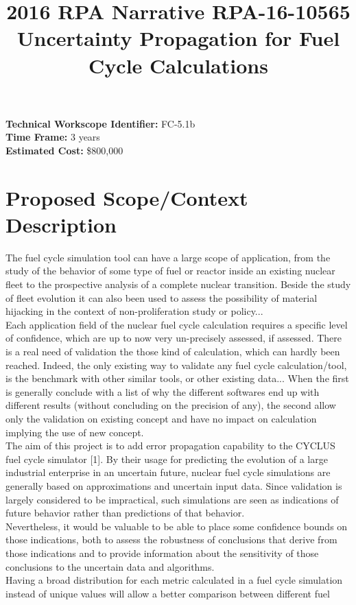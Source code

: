 \documentclass[dvips,12pt]{article}
\title{2016 RPA Narrative RPA-16-10565\\
Uncertainty Propagation for Fuel Cycle Calculations}
\begin{document}
\noindent\textbf{Technical Workscope Identifier:} FC-5.1b\\
\textbf{Time Frame:} 3 years\\
\textbf{Estimated Cost:} \$800,000\\


\section{Proposed Scope/Context Description}
The fuel cycle simulation tool can have a large
scope of application, from the study of the
behavior of some type of fuel or reactor inside an
existing nuclear fleet to the prospective analysis
of a complete nuclear transition. Beside the study
of fleet evolution it can also been used to assess
the possibility of material hijacking in the
context of non-proliferation study or
policy...\\ Each application field of the nuclear
fuel cycle calculation requires a specific level
of confidence, which are up to now very
un-precisely assessed, if assessed. There is a
real need of validation the those kind of
calculation, which can hardly been
reached. Indeed, the only existing way to validate
any fuel cycle calculation/tool, is the benchmark
with other similar tools, or other existing
data... When the first is generally conclude with
a list of why the different softwares end up with
different results (without concluding on the
precision of any), the second allow only the
validation on existing concept and have no impact
on calculation implying the use of new
concept.\\ The aim of this project is to add error
propagation capability to the CYCLUS fuel cycle
simulator [1]. By their usage for predicting the
evolution of a large industrial enterprise in an
uncertain future, nuclear fuel cycle simulations
are generally based on approximations and
uncertain input data.  Since validation is largely
considered to be impractical, such simulations are
seen as indications of future behavior rather than
predictions of that behavior. \\ Nevertheless, it
would be valuable to be able to place some
confidence bounds on those indications, both to
assess the robustness of conclusions that derive
from those indications and to provide information
about the sensitivity of those conclusions to the
uncertain data and algorithms.\\ Having a broad
distribution for each metric calculated in a fuel
cycle simulation instead of unique values will
allow a better comparison between different fuel
\end{document}
